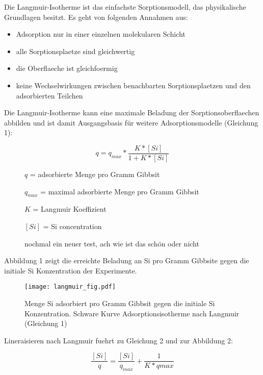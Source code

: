 \documentclass[12pt]{amsart}
\begin{document}
Die Langmuir-Isotherme ist das einfachste Sorptionsmodell, das physikalische Grundlagen besitzt. 
Es geht von folgenden Annahmen aus:

\begin{itemize}
\item Adsorption nur in einer einzelnen molekularen Schicht
\item alle Sorptionsplaetze sind gleichwertig
\item die Oberflaeche ist gleichfoermig 
\item keine Wechselwirkungen zwischen benachbarten Sorptionsplaetzen und den adsorbierten Teilchen
\end{itemize}

Die Langmuir-Isotherme kann eine maximale Beladung der Sorptionsoberflaechen abbilden und ist damit Ausgangsbasis für weitere Adsorptionsmodelle (Gleichung 1):

\begin{equation}
q=q_{max}*\frac{K*[Si]}{1+K*[Si]}
\label{eqn:langmuir}
\end{equation}

\begin{description}
\item[ ] $q$ = adsorbierte Menge pro Gramm Gibbsit
\item[ ] $q_{max}$ = maximal adsorbierte Menge pro Gramm Gibbsit
\item[ ]$K$ = Langmuir Koeffizient	
\item[ ]$[Si]$ = Si concentration
\item[] nochmal ein neuer test, ach wie ist das schön oder nicht
\end{description}

\bigskip

Abbildung 1 zeigt die erreichte Beladung an Si pro Gramm Gibbsite gegen die initiale Si Konzentration der Experimente.
\begin{figure}[htbp]
\begin{center}
\texttt{[image: langmuir\_fig.pdf]}
\caption{Menge Si adsorbiert pro Gramm Gibbsit gegen die initiale Si Konzentration. Schware Kurve Adsorptionsisotherme nach Langmuir (Gleichung 1)}
\label{default}
\end{center}
\end{figure}


Lineraisieren nach Langmuir fuehrt zu Gleichung 2 und zur Abbildung 2:

\begin{equation}
\frac{[Si]}{q}=\frac{[Si]}{q_{max}}+\frac{1}{K*q{max}}
\label{langmuirLinear}
\end{equation}
\end{document}
